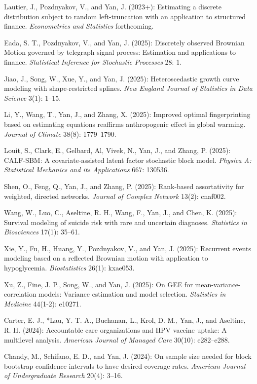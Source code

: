 \documentclass[Statistics]{vita}
\begin{document}
\begin{vita}
\begin{Publications}
\begin{RefereedJournalArticles}
  \item *Lautier, J., Pozdnyakov, V., and Yan, J. (2023+): Estimating a discrete distribution subject to random left-truncation with an application to structured finance. {\em Econometrics and Statistics\/} forthcoming. 
  \item *Eada, S. T., Pozdnyakov, V., and Yan, J. (2025): Discretely observed Brownian Motion governed by telegraph signal process: Estimation and applications to finance. {\em Statistical Inference for Stochastic Processes\/} 28: 1.
  \item *Jiao, J., Song, W., Xue, Y., and Yan, J. (2025): Heteroscedastic growth curve modeling with shape-restricted splines. {\em New England Journal of Statistics in Data Science\/} 3(1): 1--15.
  \item Li, Y., Wang, T., Yan, J., and Zhang, X. (2025): Improved optimal fingerprinting based on estimating equations reaffirms anthropogenic effect in global warming. {\em Journal of Climate\/} 38(8): 1779--1790.
  \item *Louit, S., Clark, E., Gelbard, Al, Vivek, N., Yan, J., and Zhang, P. (2025): CALF-SBM: A covariate-assisted latent factor stochastic block model. {\em Physica A: Statistical Mechanics and its Applications\/} 667: 130536.
  \item Shen, O., Feng, Q., Yan, J., and Zhang, P. (2025): Rank-based assortativity for weighted, directed networks. {\em Journal of Complex Network\/} 13(2): cnaf002.
  \item *Wang, W., Luo, C., Aseltine, R. H., Wang, F., Yan, J., and Chen, K. (2025): Survival modeling of suicide risk with rare and uncertain diagnoses. {\em Statistics in Biosciences\/} 17(1): 35--61.
  \item *Xie, Y., Fu, H., Huang, Y., Pozdnyakov, V., and Yan, J. (2025): Recurrent events modeling based on a reflected Brownian motion with application to hypoglycemia. {\em Biostatistics\/} 26(1): kxae053.
  \item *Xu, Z., Fine, J. P., Song, W., and Yan, J. (2025): On GEE for mean-variance-correlation models: Variance estimation and model selection. {\em Statistics in Medicine\/} 44(1-2): e10271.
  \item Carter, E. J., *Lau, Y. T. A., Buchanan, L., Krol, D. M., Yan, J., and Aseltine, R. H. (2024): Accountable care organizations and {HPV} vaccine uptake: A multilevel analysis. {\em American Journal of Managed Care\/} 30(10): e282--e288.
  \item *Chandy, M., Schifano, E. D., and Yan, J. (2024): On sample size needed for block bootstrap confidence intervals to have desired coverage rates. {\em American Journal of Undergraduate Research\/} 20(4): 3--16.

\end{RefereedJournalArticles}
\end{Publications}
\end{vita}
\end{document}
